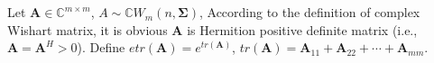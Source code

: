 \documentclass[12pt, draftclsnofoot, onecolumn]{IEEEtran}
\begin{document}

%
\appendices
\section{}\label{log expectation of OM}
Let $\mathbf{A}\in \mathbb{C}^{m\times m}$, $A\sim \mathbb{C}W_{m}(n, \mathbf{\Sigma})$, According to the definition of complex Wishart matrix, it is obvious $\mathbf{A}$ is Hermition positive definite matrix (i.e., $\mathbf{A}=\mathbf{A}^{H}>0$). Define $etr(\mathbf{A})=e^{tr(\mathbf{A})}$, $tr(\mathbf{A})=\mathbf{A}_{11}+\mathbf{A}_{22}+\cdots+\mathbf{A}_{mm}$.
\end{document}
